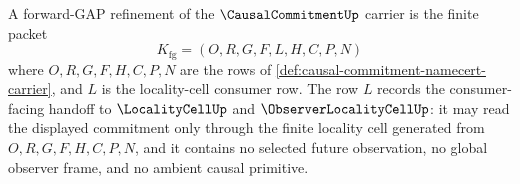 \begin{definition}
\label{def:causal-commitment-forward-gap-carrier}
A forward-GAP refinement of the $\CausalCommitmentUp$ carrier is the finite packet
$$
K_{\mathrm{fg}}=(O,R,G,F,L,H,C,P,N)
$$
where $O,R,G,F,H,C,P,N$ are the rows of \autoref{def:causal-commitment-namecert-carrier}, and $L$ is the locality-cell consumer row. The row $L$ records the consumer-facing handoff to $\LocalityCellUp$ and $\ObserverLocalityCellUp$: it may read the displayed commitment only through the finite locality cell generated from $O,R,G,F,H,C,P,N$, and it contains no selected future observation, no global observer frame, and no ambient causal primitive.
\end{definition}

